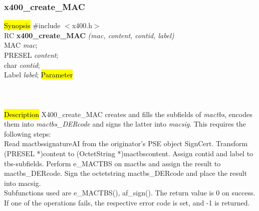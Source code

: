 \subsubsection{x400\_create\_MAC}
\label{x4_cr_MAC}
\hl{Synopsis}
\#include $<$x400.h$>$ \\ [1ex]
RC {\bf x400\_create\_MAC} {\em (mac, content, contid, label)} \\
MAC {\em *mac};  \\
PRESEL {\em *content}; \\
char {\em *contid};    \\
Label {\em *label};
\hl{Parameter}
 \\[1ex]
 \\[1ex]
 \\[1ex]
 \\[1ex]
\hl{Description}
X400\_create\_MAC
creates and fills the subfields of {\em mac\pf tbs},
encodes them into {\em mac\pf tbs\_DERcode} and
signs the latter into {\em mac\pf sig}.
This requires the following steps:
\\
Read mac\pf tbs\pf signatureAI from the
originator's PSE object SignCert.
Transform (PRESEL *)content to (OctetString *)mac\pf tbs\pf \-con\-tent.
Assign contid and label to tbs-subfields.
Perform e\_MACTBS on mac\pf tbs and assign the result to mac\pf tbs\_DERcode.
Sign the octetstring mac\pf tbs\_DERcode and place the result into mac\pf sig.
\\
Subfunctions used are e\_MACTBS(), af\_sign().
The return value is 0 on success.
If one of the operations fails,
the respective error code is set, and -1 is returned.

